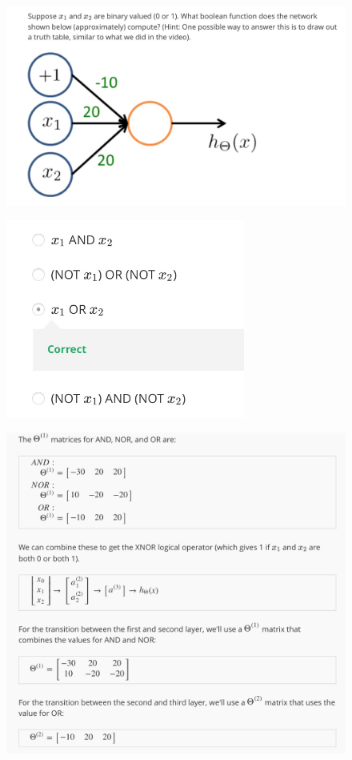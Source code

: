 \documentclass[12pt, A4,onecolumn]{article} %
\begin{document}
\begin{figure}[H]
	\centering
	\includegraphics[width=1\textwidth]{./ImagenesW4/testExamplesI_1}
\end{figure}

\begin{figure}[H]
	\centering
	\includegraphics[width=0.7\textwidth]{./ImagenesW4/testExamplesI_2}
\end{figure}


\begin{figure}[H]
	\centering
	\includegraphics[width=1\textwidth]{./ImagenesW4/examplesII1}
\end{figure}
\end{document}

